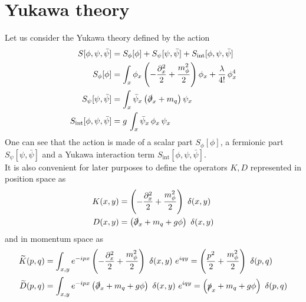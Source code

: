 \section{Yukawa theory}
\label{sec:Yukawa_theory}
Let us consider the Yukawa theory defined by the action
\begin{equation}
\begin{aligned}
    S[\phi,\psi,\bar\psi] &= S_\phi[\phi] + S_\psi[\psi, \bar\psi] + S_\text{int}[\phi, \psi, \bar\psi]\\
     S_\phi[\phi] &= \int_x \phi_x \left(-\frac{\partial^2_x}{2} + \frac{m_\phi^2}{2}\right) \phi_x + \frac{\lambda}{4!} \, \phi_x^4 \\
     S_\psi[\psi, \bar\psi] &= \int_x \bar \psi_x \left(\slashed{\partial}_x + m_q \right) \psi_x \\
     S_\text{int}[\phi, \psi, \bar\psi] &= g \, \int_x \bar \psi_x \, \phi_x \, \psi_x
    \label{eq:full_action_continuum}
\end{aligned}
\end{equation}
One can see that the action is made of a scalar part $S_\phi[\phi]$, a fermionic part $S_\psi[\psi, \bar\psi]$ and a Yukawa interaction term $S_\text{int}[\phi, \psi, \bar\psi]$. \\
It is also convenient for later purposes to define the operators $K, D$ represented in position space as 
\begin{equation}
    \begin{aligned}
        K(x, y) &=  \left(-\frac{\partial^2_x}{2} + \frac{m_\phi^2}{2}\right) \ \delta(x,y) \\
        D(x, y) &= \left(\slashed{\partial}_x + m_q + g\phi \right) \ \delta(x,y)
    \end{aligned}
    \label{eq:definition_kinetic_terms_continuum}
\end{equation}
and in momentum space as
\begin{equation}
    \begin{aligned}
        \widetilde{K}(p, q) &=  \int_{x,y} e^{-ipx} \left(-\frac{\partial^2_x}{2} + \frac{m_\phi^2}{2}\right) \ \delta(x,y) \ e^{iqy} = \left(\frac{p^2}{2} + \frac{m_\phi^2}{2}\right) \ \delta(p,q) \\
        \widetilde{D}(p, q) &= \int_{x,y} e^{-ipx} \left(\slashed{\partial}_x + m_q + g\phi \right) \ \delta(x,y) \ e^{iqy} = \left(\slashed{p}_x + m_q + g\phi \right) \ \delta(p,q)
    \end{aligned}
    \label{eq:definition_kinetic_terms_continuum}
\end{equation}
